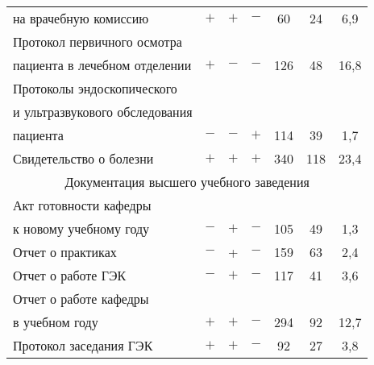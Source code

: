 \begin{table*}
\begin{center}
\begin{tabular}{|l|c|c|c|c|c|c|}
на врачебную комиссию&$+$&$+$&$-$&\hphantom{9}60&24&\hphantom{9}6,9\\
Протокол первичного осмотра&&&&&&\\
пациента в лечебном отделении&$+$&$-$&$-$&126&48&16,8\\
Протоколы эндоскопического &&&&&&\\
и ультразвукового обследования&&&&&&\\
пациента&$-$&$-$&$+$&114&39&\hphantom{9}1,7\\
Свидетельство о болезни&$+$&$+$&$+$&340&118\hphantom{9}&23,4\\
\hline
\multicolumn{7}{|c|}{Документация высшего учебного заведения}\\
\hline
Акт готовности кафедры&&&&&&\\
к новому учебному году&$-$&$+$&$-$&105&49&\hphantom{9}1,3\\
Отчет о практиках&$-$&+&$-$&159&63&\hphantom{9}2,4\\
Отчет о работе ГЭК&$-$&$+$&$-$&117&41&\hphantom{9}3,6\\
Отчет о работе кафедры&&&&&&\\
 в учебном году&$+$&$+$&$-$&294&92&12,7\\
Протокол заседания ГЭК&$+$&$+$&$-$&\hphantom{9}92&27&\hphantom{9}3,8\\
\hline
\end{tabular}
\end{center}
\vspace*{12pt}
\end{table*}

